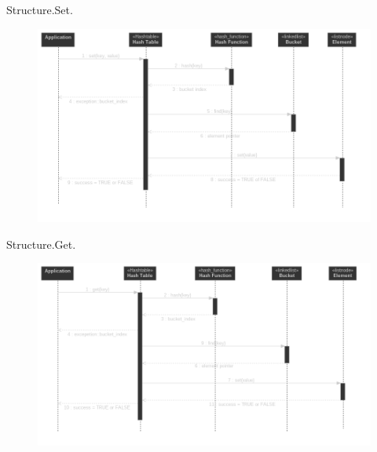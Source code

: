 \documentclass{beamer}
\begin{document}
\begin{frame}{Structure.}{Set.}
  \begin{figure}
    \includegraphics[scale=0.3]{structure_set_sequence}
  \end{figure}
\end{frame}

\begin{frame}{Structure.}{Get.}
  \begin{figure}
    \includegraphics[scale=0.3]{structure_get_sequence}
  \end{figure}
\end{frame}
\end{document}
